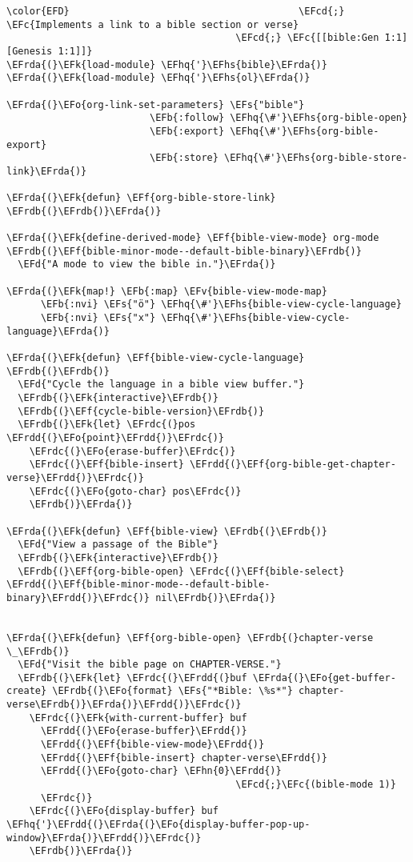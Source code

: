 \documentclass[a4wide,10pt]{article}
\newcommand{\EFc}[1]{\textcolor{EFc}{#1}} %
\newcommand{\EFcd}[1]{\textcolor{EFcd}{#1}} %
\newcommand{\EFs}[1]{\textcolor{EFs}{#1}} %
\newcommand{\EFd}[1]{\textcolor{EFd}{#1}} %
\newcommand{\EFk}[1]{\textcolor{EFk}{#1}} %
\newcommand{\EFb}[1]{\textcolor{EFb}{#1}} %
\newcommand{\EFf}[1]{\textcolor{EFf}{#1}} %
\newcommand{\EFv}[1]{\textcolor{EFv}{#1}} %
\newcommand{\EFo}[1]{\textcolor{EFo}{#1}} %
\newcommand{\EFhn}[1]{\textcolor{EFhn}{\textbf{#1}}} %
\newcommand{\EFhq}[1]{\textcolor{EFhq}{#1}} %
\newcommand{\EFhs}[1]{\textcolor{EFhs}{#1}} %
\newcommand{\EFrda}[1]{\textcolor{EFrda}{#1}} %
\newcommand{\EFrdb}[1]{\textcolor{EFrdb}{#1}} %
\newcommand{\EFrdc}[1]{\textcolor{EFrdc}{#1}} %
\newcommand{\EFrdd}[1]{\textcolor{EFrdd}{#1}} %
\begin{document}
\begin{Code}
\begin{Verbatim}
\color{EFD}                                        \EFcd{;} \EFc{Implements a link to a bible section or verse}
                                        \EFcd{;} \EFc{[[bible:Gen ̄1:1][Genesis 1:1]]}
\EFrda{(}\EFk{load-module} \EFhq{'}\EFhs{bible}\EFrda{)}
\EFrda{(}\EFk{load-module} \EFhq{'}\EFhs{ol}\EFrda{)}

\EFrda{(}\EFo{org-link-set-parameters} \EFs{"bible"}
                         \EFb{:follow} \EFhq{\#'}\EFhs{org-bible-open}
                         \EFb{:export} \EFhq{\#'}\EFhs{org-bible-export}
                         \EFb{:store} \EFhq{\#'}\EFhs{org-bible-store-link}\EFrda{)}

\EFrda{(}\EFk{defun} \EFf{org-bible-store-link} \EFrdb{(}\EFrdb{)}\EFrda{)}

\EFrda{(}\EFk{define-derived-mode} \EFf{bible-view-mode} org-mode \EFrdb{(}\EFf{bible-minor-mode--default-bible-binary}\EFrdb{)}
  \EFd{"A mode to view the bible in."}\EFrda{)}

\EFrda{(}\EFk{map!} \EFb{:map} \EFv{bible-view-mode-map}
      \EFb{:nvi} \EFs{"ö"} \EFhq{\#'}\EFhs{bible-view-cycle-language}
      \EFb{:nvi} \EFs{"x"} \EFhq{\#'}\EFhs{bible-view-cycle-language}\EFrda{)}

\EFrda{(}\EFk{defun} \EFf{bible-view-cycle-language} \EFrdb{(}\EFrdb{)}
  \EFd{"Cycle the language in a bible view buffer."}
  \EFrdb{(}\EFk{interactive}\EFrdb{)}
  \EFrdb{(}\EFf{cycle-bible-version}\EFrdb{)}
  \EFrdb{(}\EFk{let} \EFrdc{(}pos \EFrdd{(}\EFo{point}\EFrdd{)}\EFrdc{)}
    \EFrdc{(}\EFo{erase-buffer}\EFrdc{)}
    \EFrdc{(}\EFf{bible-insert} \EFrdd{(}\EFf{org-bible-get-chapter-verse}\EFrdd{)}\EFrdc{)}
    \EFrdc{(}\EFo{goto-char} pos\EFrdc{)}
    \EFrdb{)}\EFrda{)}

\EFrda{(}\EFk{defun} \EFf{bible-view} \EFrdb{(}\EFrdb{)}
  \EFd{"View a passage of the Bible"}
  \EFrdb{(}\EFk{interactive}\EFrdb{)}
  \EFrdb{(}\EFf{org-bible-open} \EFrdc{(}\EFf{bible-select} \EFrdd{(}\EFf{bible-minor-mode--default-bible-binary}\EFrdd{)}\EFrdc{)} nil\EFrdb{)}\EFrda{)}


\EFrda{(}\EFk{defun} \EFf{org-bible-open} \EFrdb{(}chapter-verse \_\EFrdb{)}
  \EFd{"Visit the bible page on CHAPTER-VERSE."}
  \EFrdb{(}\EFk{let} \EFrdc{(}\EFrdd{(}buf \EFrda{(}\EFo{get-buffer-create} \EFrdb{(}\EFo{format} \EFs{"*Bible: \%s*"} chapter-verse\EFrdb{)}\EFrda{)}\EFrdd{)}\EFrdc{)}
    \EFrdc{(}\EFk{with-current-buffer} buf
      \EFrdd{(}\EFo{erase-buffer}\EFrdd{)}
      \EFrdd{(}\EFf{bible-view-mode}\EFrdd{)}
      \EFrdd{(}\EFf{bible-insert} chapter-verse\EFrdd{)}
      \EFrdd{(}\EFo{goto-char} \EFhn{0}\EFrdd{)}
                                        \EFcd{;}\EFc{(bible-mode 1)}
      \EFrdc{)}
    \EFrdc{(}\EFo{display-buffer} buf \EFhq{'}\EFrdd{(}\EFrda{(}\EFo{display-buffer-pop-up-window}\EFrda{)}\EFrdd{)}\EFrdc{)}
    \EFrdb{)}\EFrda{)}


\end{Verbatim}
\end{Code}
\end{document}
